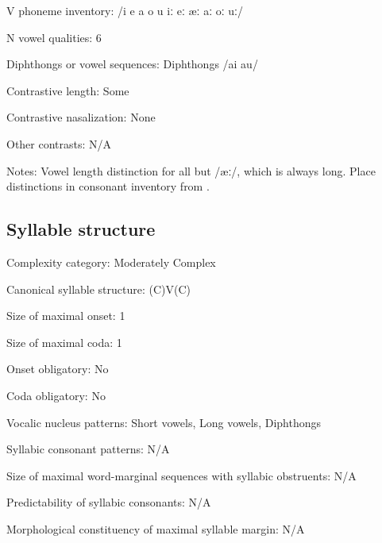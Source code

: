 {\begin{appendixdesc}
\item[V phoneme inventory:] /i e a o u iː eː æː aː oː uː/

\item[N vowel qualities:] 6

\item[Diphthongs or vowel sequences:] Diphthongs /ai au/

\item[Contrastive length:] Some

\item[Contrastive nasalization:] None

\item[Other contrasts:] N/A

\item[Notes:] Vowel length distinction for all but /æː/, which is always long. Place distinctions in consonant inventory from \citet[191]{KostićEtAl1977}.
\end{appendixdesc}
\subsection*{Syllable structure}
\begin{appendixdesc}

\item[Complexity category:] Moderately Complex

\item[Canonical syllable structure:] (C)V(C) \citep[199]{KostićEtAl1977}

\item[Size of maximal onset:] 1

\item[Size of maximal coda:] 1

\item[Onset obligatory:] No

\item[Coda obligatory:] No

\item[Vocalic nucleus patterns:] Short vowels, Long vowels, Diphthongs

\item[Syllabic consonant patterns:] N/A

\item[Size of maximal word-marginal sequences with syllabic obstruents:] N/A

\item[Predictability of syllabic consonants:] N/A

\item[Morphological constituency of maximal syllable margin:] N/A


\end{appendixdesc}}
